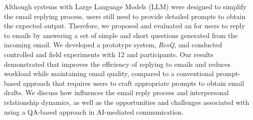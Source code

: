 Although systems with Large Language Models (LLM) were designed to simplify the email replying process, users still need to provide detailed prompts to obtain the expected output.
Therefore, we proposed and evaluated an  for users to reply to emails by answering a set of simple and short questions generated from the incoming email.
We developed a prototype system, \textit{ResQ}, and conducted controlled and field experiments with 12 and  participants.
Our results demonstrated that  improves the efficiency of replying to emails and reduces workload while maintaining email quality, compared to a conventional prompt-based approach that requires users to craft appropriate prompts to obtain email drafts.
We discuss how  influences the email reply process and interpersonal relationship dynamics, as well as the opportunities and challenges associated with using a QA-based approach in AI-mediated communication.

